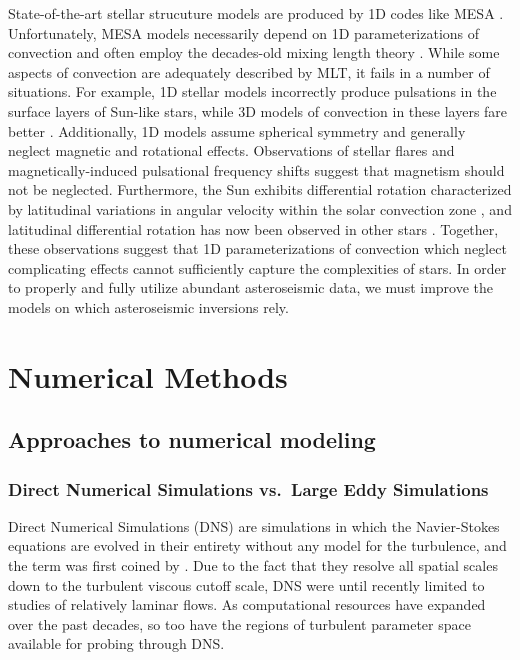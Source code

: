 State-of-the-art stellar strucuture models are produced by 1D codes like MESA \citep{paxton&all2011}.
Unfortunately, MESA models necessarily depend on 1D parameterizations of convection and often employ the decades-old mixing length theory \cite[MLT,][]{bohm-vitense1958}.
While some aspects of convection are adequately described by MLT, it fails in a number of situations.
For example, 1D stellar models incorrectly produce pulsations in the surface layers of Sun-like stars, while 3D models of convection in these layers fare better \citep{jorgensen&weiss2019}.
Additionally, 1D models assume spherical symmetry and generally neglect magnetic and rotational effects.
Observations of stellar flares \citep{kowalski2016} and magnetically-induced pulsational frequency shifts \citep{santos&all2018} suggest that magnetism should not be neglected.
Furthermore, the Sun exhibits differential rotation characterized by latitudinal variations in angular velocity within the solar convection zone \citep{thompson&all1996, schou&all1998}, and latitudinal differential rotation has now been observed in other stars \citep{benomar&all2018}.
Together, these observations suggest that 1D parameterizations of convection which neglect complicating effects cannot sufficiently capture the complexities of stars.
In order to properly and fully utilize abundant asteroseismic data, we must improve the models on which asteroseismic inversions rely.


\section{Numerical Methods}
\label{sct:numerics}

\subsection{Approaches to numerical modeling}


\subsubsection{Direct Numerical Simulations vs.~Large Eddy Simulations}
Direct Numerical Simulations (DNS) are simulations in which the Navier-Stokes equations are evolved in their entirety without any model for the turbulence, and the term was first coined by \citet{orzag1970}.
Due to the fact that they resolve all spatial scales down to the turbulent viscous cutoff scale, DNS were until recently limited to studies of relatively laminar flows.
As computational resources have expanded over the past decades, so too have the regions of turbulent parameter space available for probing through DNS.


